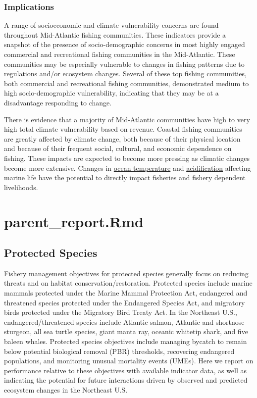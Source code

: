 \documentclass[
  10pt,
]{article}
\begin{document}
\subsubsection{Implications}\label{implications-4}

A range of socioeconomic and climate vulnerability concerns are found throughout Mid-Atlantic fishing communities. These indicators provide a snapshot of the presence of socio-demographic concerns in most highly engaged commercial and recreational fishing communities in the Mid-Atlantic. These communities may be especially vulnerable to changes in fishing patterns due to regulations and/or ecosystem changes. Several of these top fishing communities, both commercial and recreational fishing communities, demonstrated medium to high socio-demographic vulnerability, indicating that they may be at a disadvantage responding to change.

There is evidence that a majority of Mid-Atlantic communities have high to very high total climate vulnerability based on revenue. Coastal fishing communities are greatly affected by climate change, both because of their physical location and because of their frequent social, cultural, and economic dependence on fishing. These impacts are expected to become more pressing as climatic changes become more extensive. Changes in \href{https://noaa-edab.github.io/catalog/bottom_temp_insitu.html}{ocean temperature} and \href{https://noaa-edab.github.io/catalog/ocean_acidification.html}{acidification} affecting marine life have the potential to directly impact fisheries and fishery dependent livelihoods.

\section{parent\_report.Rmd}\label{parent_report.rmd-5}

\subsection{Protected Species}\label{protected-species}

Fishery management objectives for protected species generally focus on reducing threats and on habitat conservation/restoration. Protected species include marine mammals protected under the Marine Mammal Protection Act, endangered and threatened species protected under the Endangered Species Act, and migratory birds protected under the Migratory Bird Treaty Act. In the Northeast U.S., endangered/threatened species include Atlantic salmon, Atlantic and shortnose sturgeon, all sea turtle species, giant manta ray, oceanic whitetip shark, and five baleen whales. Protected species objectives include managing bycatch to remain below potential biological removal (PBR) thresholds, recovering endangered populations, and monitoring unusual mortality events (UMEs). Here we report on performance relative to these objectives with available indicator data, as well as indicating the potential for future interactions driven by observed and predicted ecosystem changes in the Northeast U.S.
\end{document}
